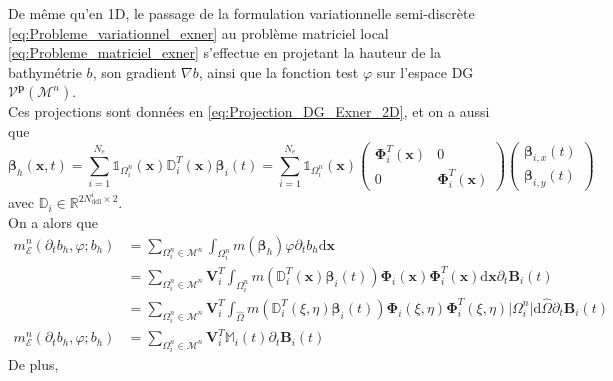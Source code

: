 \documentclass[11pt, a4paper, oneside]{report}
\begin{document}
De même qu'en 1D, le passage de la formulation variationnelle semi-discrète \eqref{eq:Probleme_variationnel_exner} au problème matriciel local \eqref{eq:Probleme_matriciel_exner} s'effectue en projetant la hauteur de la bathymétrie $b$, son gradient $\nabla b$, ainsi que la fonction test $\varphi$ sur l'espace DG $\mathcal{V}^\mathbf{p}(\mathcal{M}^n)$. \\
Ces projections sont données en \eqref{eq:Projection_DG_Exner_2D}, et on a aussi que
\begin{equation}
    \bm{\beta}_h(\bm{x}, t) = \sum_{i = 1}^{N_e} \mathds{1}_{\Omega_i^n}(\bm{x}) \mathbb{D}_i^T(\bm{x}) \bm{\beta}_i(t) = \sum_{i = 1}^{N_e} \mathds{1}_{\Omega_i^n}(\bm{x}) \begin{pmatrix} \bm{\Phi}_i^T(\bm{x}) & 0 \\ 0 & \bm{\Phi}_i^T(\bm{x}) \end{pmatrix} \begin{pmatrix} \bm{\beta}_{i, x}(t) \\ \bm{\beta}_{i, y}(t) \end{pmatrix}
\end{equation}
avec $\mathbb{D}_i \in \mathbb{R}^{2N_\text{ddl}^i \times 2}$. \\
On a alors que
\begin{equation}
    \begin{aligned}
        m_\mathcal{E}^n(\partial_t b_h, \varphi; b_h) & = \sum_{\Omega_i^n \in \mathcal{M}^n} \int_{\Omega_i^n} m(\bm{\beta}_h) \varphi \partial_t b_h \text{d}\bm{x} \\
        & = \sum_{\Omega_i^n \in \mathcal{M}^n} \bm{V}_i^T \int_{\Omega_i^n} m \left( \mathbb{D}_i^T(\bm{x}) \bm{\beta}_i(t) \right) \bm{\Phi}_i(\bm{x}) \bm{\Phi}_i^T(\bm{x}) \text{d}\bm{x} \partial_t \bm{B}_i(t) \\
        & = \sum_{\Omega_i^n \in \mathcal{M}^n} \bm{V}_i^T \int_{\widehat{\Omega}} m \left( \mathbb{D}_i^T(\xi, \eta) \bm{\beta}_i(t) \right) \bm{\Phi}_i(\xi, \eta) \bm{\Phi}_i^T(\xi, \eta) \lvert \Omega_i^n \rvert \text{d}\widehat{\Omega} \partial_t \bm{B}_i(t) \\
        m_\mathcal{E}^n(\partial_t b_h, \varphi; b_h) & = \sum_{\Omega_i^n \in \mathcal{M}^n} \bm{V}_i^T \mathbb{M}_i(t) \partial_t \bm{B}_i(t)
    \end{aligned}
\end{equation}
\enlargethispage{1\baselineskip}
De plus,
\end{document}
